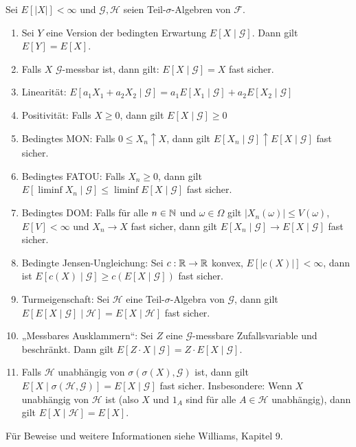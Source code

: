\documentclass[a4paper,twoside,DIV15,BCOR12mm]{scrbook}
\newcommand{\cF}{\mathcal F}
\begin{document}
\begin{bemerkung}
Sei $E[|X|]<\infty$ und $\mathcal G, \mathcal H$ seien Teil-$\sigma$-Algebren von $\cF$.
\begin{enumerate}
\item Sei $Y$ eine Version der bedingten Erwartung $E[X\mid \mathcal G]$. Dann gilt $E[Y]=E[X]$.
\item Falls $X$ $\mathcal G$-messbar ist, dann gilt: $E[X\mid \mathcal G]=X$ fast sicher.
\item Linearität: $E[a_1 X_1 + a_2 X_2\mid \mathcal G] = a_1 E[X_1\mid \mathcal G] + a_2 E[X_2 \mid \mathcal G]$
\item Positivität: Falls $X\ge 0$, dann gilt $E[X\mid \mathcal G] \ge 0$
\item Bedingtes MON: Falls $0 \le X_n \uparrow X$, dann gilt $E[X_n \mid \mathcal G] \uparrow E[X \mid \mathcal G]$ fast sicher.
\item Bedingtes FATOU: Falls $X_n\ge 0$, dann gilt $E[\liminf X_n \mid\mathcal G] \le \liminf E[X \mid \mathcal G]$ fast sicher.
\item Bedingtes DOM: Falls für alle $n\in\mathbb{N}$ und $\omega\in\Omega$ gilt $|X_n(\omega) |\le V(\omega)$, $E[V]<\infty$ und $X_n\to X$ fast sicher, dann gilt $E[X_n\mid \mathcal G] \to E[X\mid\mathcal G]$ fast sicher.
\item Bedingte Jensen-Ungleichung: Sei $c:\mathbb{R}\to\mathbb{R}$ konvex, $E[|c(X)|]<\infty$, dann ist $E[c(X)\mid\mathcal G] \ge c(E[X\mid \mathcal G])$ fast sicher.
\item Turmeigenschaft: Sei $\mathcal H$ eine Teil-$\sigma$-Algebra von $\mathcal G$, dann gilt $E[E[X\mid\mathcal G]\mid\mathcal H] = E[X\mid\mathcal H]$ fast sicher.
\item „Messbares Ausklammern“: Sei $Z$ eine $\mathcal G$-messbare Zufallsvariable und beschränkt. Dann gilt $E[Z\cdot X\mid \mathcal G] = Z\cdot E[X\mid \mathcal G]$.
\item Falls $\mathcal H$ unabhängig von $\sigma( \sigma(X), \mathcal G)$ ist, dann gilt $E[X \mid \sigma(\mathcal H, \mathcal G)] = E[X\mid \mathcal G]$ fast sicher. Insbesondere: Wenn $X$ unabhängig von $\mathcal H$ ist (also $X$ und $1_A$ sind für alle $A\in\mathcal H$ unabhängig), dann gilt $E[X\mid \mathcal H] = E[X]$.
\end{enumerate}
\end{bemerkung}

Für Beweise und weitere Informationen siehe Williams, Kapitel 9.
\end{document}
